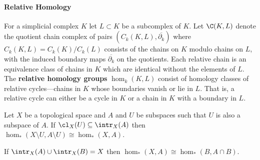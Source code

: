 \paragraph*{\textbf{Relative Homology}}


For a simplicial complex $K$ let $L\subset K$ be a subcomplex of $K$.
Let $\C(K, L)$ denote the quotient chain complex of pairs $(C_k(K, L), \overline{\partial_k})$ where $C_k(K, L) = C_k(K)/C_k(L)$ consists of the chains on $K$ modulo chains on $L$, with the induced boundary maps $\overline{\partial_k}$ on the quotients.
Each relative chain is an equivalence class of chains in $K$ which are identical without the elements of $L$.
The \textbf{relative homology groups} $\hom_k(K, L)$ consist of homology classes of relative cycles---chains in $K$ whose boundaries vanish or lie in $L$.
That is, a relative cycle can either be a cycle in $K$ or a chain in $K$ with a boundary in $L$.

\begin{theorem}[Excision]\label{thm:excision}
    Let $X$ be a topological space and $A$ and $U$ be subspaces such that $U$ is also a subspace of $A$.
    If $\cl_X(U)\subseteq \intr_X(A)$ then $\hom_*(X\setminus U, A\setminus U)\cong \hom_*(X, A)$.
\end{theorem}

\begin{corollary}
    If $\intr_X(A)\cup \intr_X(B) = X$ then $\hom_*(X, A)\cong \hom_*(B, A\cap B)$.
\end{corollary}

